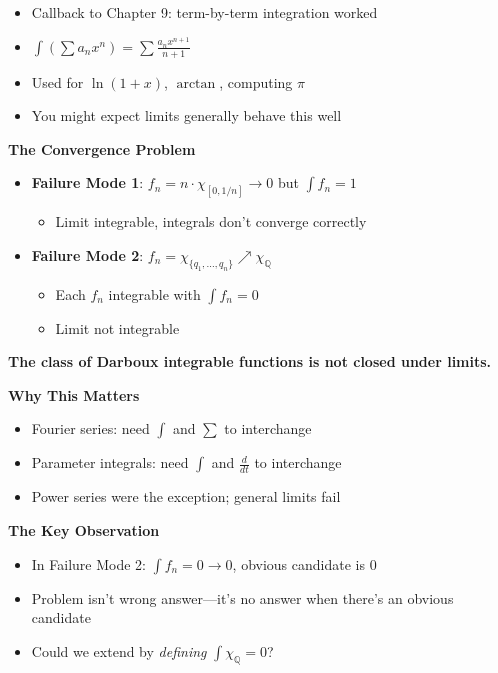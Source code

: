\documentclass[
  10pt,
  letterpaper,
]{scrbook}
\providecommand{\tightlist}{%
  \setlength{\itemsep}{0pt}\setlength{\parskip}{0pt}}
\begin{document}
\begin{itemize}
\tightlist
\item
  Callback to Chapter 9: term-by-term integration worked
\item
  \(\int \left( \sum a_n x^n \right) = \sum \frac{a_n x^{n+1}}{n+1}\)
\item
  Used for \(\ln(1+x)\), \(\arctan\), computing \(\pi\)
\item
  You might expect limits generally behave this well
\end{itemize}

\textbf{The Convergence Problem}

\begin{itemize}
\tightlist
\item
  \textbf{Failure Mode 1}: \(f_n = n \cdot \chi_{[0,1/n]} \to 0\) but
  \(\int f_n = 1\)

  \begin{itemize}
  \tightlist
  \item
    Limit integrable, integrals don't converge correctly
  \end{itemize}
\item
  \textbf{Failure Mode 2}:
  \(f_n = \chi_{\{q_1,\ldots,q_n\}} \nearrow \chi_{\mathbb{Q}}\)

  \begin{itemize}
  \tightlist
  \item
    Each \(f_n\) integrable with \(\int f_n = 0\)
  \item
    Limit not integrable
  \end{itemize}
\end{itemize}

\textbf{The class of Darboux integrable functions is not closed under
limits.}

\textbf{Why This Matters}

\begin{itemize}
\tightlist
\item
  Fourier series: need \(\int\) and \(\sum\) to interchange
\item
  Parameter integrals: need \(\int\) and \(\frac{d}{dt}\) to interchange
\item
  Power series were the exception; general limits fail
\end{itemize}

\textbf{The Key Observation}

\begin{itemize}
\tightlist
\item
  In Failure Mode 2: \(\int f_n = 0 \to 0\), obvious candidate is \(0\)
\item
  Problem isn't wrong answer---it's no answer when there's an obvious
  candidate
\item
  Could we extend by \emph{defining} \(\int \chi_{\mathbb{Q}} = 0\)?
\end{itemize}
\end{document}
